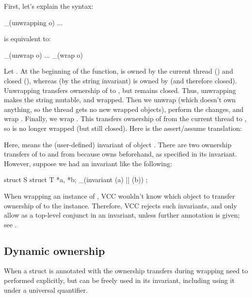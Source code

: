 
\noindent
First, let's explain the syntax:
\begin{VCC}
_(unwrapping o) { ... }
\end{VCC}
is equivalent to:
\begin{VCC}
_(unwrap o) { ... } _(wrap o)
\end{VCC}
Let . 
At the beginning of the function,  is owned by the
current thread (\vcc{\me}) and closed (\ie \vcc{\wrapped}), whereas
(by the string invariant)  is owned by  (and
therefore closed).  Unwrapping  transfers ownership of 
 to \vcc{\me}, but  remains closed.
Thus, unwrapping  makes the string mutable, and 
wrapped.  Then we unwrap  (which doesn't own anything, so
the thread gets no new wrapped objects), perform the changes, and wrap
.  Finally, we wrap .  This transfers ownership
of  from the current thread to , so 
is no longer wrapped (but still closed).  Here is
the assert\slash assume translation:


\noindent
Here,  means the (user-defined) invariant of object .
There are two ownership transfers
of  to and from \vcc{\me} because  owns  beforehand,
as specified in its invariant.
However, suppose we had an invariant like the following:
\begin{VCC}
struct S {
  struct T *a, *b;
  _(invariant \mine(a) || \mine(b))
};
\end{VCC}
When wrapping an instance of , VCC wouldn't know which object
to transfer ownership of to the instance. Therefore, 
VCC rejects such invariants, and only allow 
as a top-level conjunct in an invariant, unless further annotation is given;
see .

\subsection{Dynamic ownership}
\label{sect:dynamic-ownership}

When a struct is annotated with  the ownership transfers
during wrapping need to performed explicitly, but  can
be freely used in its invariant, including using it under a universal
quantifier.

